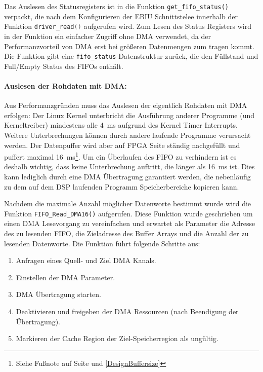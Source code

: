 Das Auslesen des Statusregisters ist in die Funktion \lstinline$get_fifo_status()$ verpackt, die nach dem Konfigurieren der EBIU Schnittstelee innerhalb der Funktion \lstinline[language=C]$driver_read()$ aufgerufen wird. Zum Lesen des Status Registers wird in der Funktion ein einfacher Zugriff ohne DMA verwendet, da der Performanzvorteil von DMA erst bei größeren Datenmengen zum tragen kommt. Die Funktion gibt eine \lstinline$fifo_status$ Datenstruktur zurück, die den Füllstand und Full/Empty Status des FIFOs enthält.  

\paragraph{Auslesen der Rohdaten mit DMA:}
Aus Performanzgründen muss das Auslesen der eigentlich Rohdaten mit DMA erfolgen: Der Linux Kernel unterbricht die Ausführung anderer Programme (und Kerneltreiber) mindestens alle \SI{4}{\milli\second} aufgrund des Kernel Timer Interrupts. Weitere Unterbrechungen können durch andere laufende Programme verursacht werden. Der Datenpuffer wird aber auf FPGA Seite ständig nachgefüllt und puffert maximal \SI{16}{\milli\second}\footnote{Siehe Fußnote auf Seite \pageref{FootnoteActualBufferSize} und \ref{DesignBuffersize}}. Um ein Überlaufen des FIFO zu verhindern ist es deshalb wichtig, dass keine Unterbrechung auftritt, die länger als \SI{16}{\milli\second} ist. Dies kann lediglich durch eine DMA Übertragung garantiert werden, die nebenläufig zu dem auf dem DSP laufenden Programm Speicherbereiche kopieren kann.

Nachdem die maximale Anzahl möglicher Datenworte bestimmt wurde wird die Funktion \lstinline$FIFO_Read_DMA16()$ aufgerufen. Diese Funktion wurde geschrieben um einen DMA Lesevorgang zu vereinfachen und erwartet als Parameter die Adresse des zu lesenden FIFO, die Zieladresse des Buffer Arrays und die Anzahl der zu lesenden Datenworte. Die Funktion führt folgende Schritte aus:

\begin{enumerate}
    \item Anfragen eines Quell- und Ziel DMA Kanals.
    \item Einstellen der DMA Parameter.
    \item DMA Übertragung starten.
    \item Deaktivieren und freigeben der DMA Ressourcen (nach Beendigung der Übertragung).
    \item Markieren der Cache Region der Ziel-Speicherregion als ungültig.
\end{enumerate}


